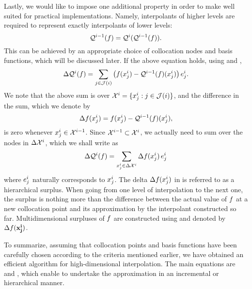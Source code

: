 Lastly, we would like to impose one additional property in order to make
 well suited for practical implementations. Namely,
interpolants of higher levels are required to represent exactly interpolants
of lower levels:
\begin{equation} \elab{tensor-exactness}
  \tensor{i - 1}(\f) = \tensor{i}(\tensor{i - 1}(\f)).
\end{equation}
This can be achieved by an appropriate choice of collocation nodes and basis
functions, which will be discussed later. If the above equation holds, using
 and ,
\[
  \Delta\mathcal{Q}^{i}(f) = \sum_{j \in \mathcal{J}(i)} \left(f(x^i_j) - \mathcal{Q}^{i - 1}(f)(x^i_j)\right) e^i_j.
\]
We note that the above sum is over $\mathcal{X}^i = \{ x^i_j: j \in \mathcal{J}(i) \}$, and
the difference in the sum, which we denote by
\begin{equation} \elab{surplus}
  \surplus(\x^i_j) = \f(\x^i_j) - \tensor{i - 1}(\f)(\x^i_j),
\end{equation}
is zero whenever $x^i_j \in \mathcal{X}^{i - 1}$. Since $\mathcal{X}^{i - 1} \subset \mathcal{X}^i$, we
actually need to sum over the nodes in $\Delta\mathcal{X}^i$, which we shall write as
\begin{equation} \elab{tensor-surplus-1d}
  \Delta\tensor{i}(\f) = \sum_{\x^i_j \in \Delta\X^i} \surplus(\x^i_j) \, \e^i_j
\end{equation}
where $e^i_j$ naturally corresponds to $x^i_j$. The delta $\Delta f(x^i_j)$
in  is referred to as a hierarchical surplus. When going from one
level of interpolation to the next one, the surplus is nothing more than the
difference between the actual value of $f$ at a new collocation point and its
approximation by the interpolant constructed so far. Multidimensional surpluses
of $f$ are constructed using  and
 denoted by $\Delta f(\mathbf{x}^{\mathbf{i}}_{\mathbf{j}})$.

To summarize, assuming that collocation points and basis functions have been
carefully chosen according to the criteria mentioned earlier, we have obtained
an efficient algorithm for high-dimensional interpolation. The main equations
are  and , which enable to
undertake the approximation in an incremental or hierarchical manner.
